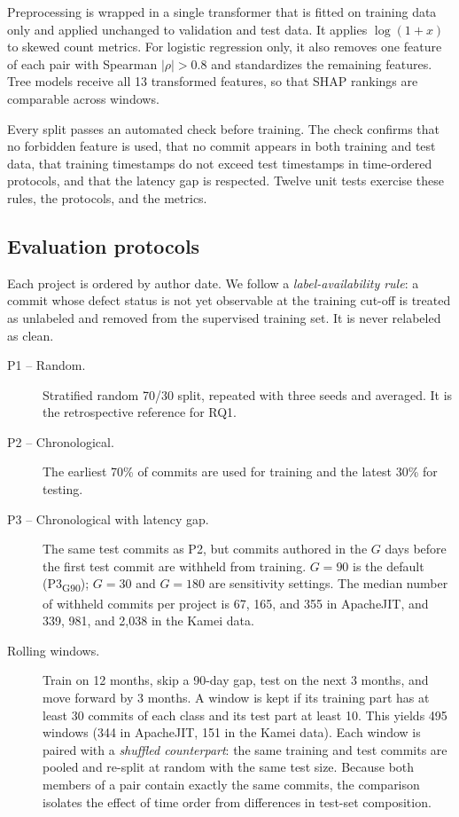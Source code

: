 \documentclass[11pt,a4paper]{article}
\newcommand{\pthree}{P3\textsubscript{G90}}
\begin{document}
Preprocessing is wrapped in a single transformer that is fitted on training data only and applied unchanged to validation and test data. It applies $\log(1+x)$ to skewed count metrics. For logistic regression only, it also removes one feature of each pair with Spearman $|\rho|>0.8$ and standardizes the remaining features. Tree models receive all 13 transformed features, so that SHAP rankings are comparable across windows.

Every split passes an automated check before training. The check confirms that no forbidden feature is used, that no commit appears in both training and test data, that training timestamps do not exceed test timestamps in time-ordered protocols, and that the latency gap is respected. Twelve unit tests exercise these rules, the protocols, and the metrics.

\subsection{Evaluation protocols}\label{sec:protocols}

Each project is ordered by author date. We follow a \emph{label-availability rule}: a commit whose defect status is not yet observable at the training cut-off is treated as unlabeled and removed from the supervised training set. It is never relabeled as clean.

\begin{description}
\item[P1 -- Random.] Stratified random 70/30 split, repeated with three seeds and averaged. It is the retrospective reference for RQ1.
\item[P2 -- Chronological.] The earliest 70\% of commits are used for training and the latest 30\% for testing.
\item[P3 -- Chronological with latency gap.] The same test commits as P2, but commits authored in the $G$ days before the first test commit are withheld from training. $G=90$ is the default (\pthree); $G=30$ and $G=180$ are sensitivity settings. The median number of withheld commits per project is 67, 165, and 355 in ApacheJIT, and 339, 981, and 2{,}038 in the Kamei data.
\item[Rolling windows.] Train on 12 months, skip a 90-day gap, test on the next 3 months, and move forward by 3 months. A window is kept if its training part has at least 30 commits of each class and its test part at least 10. This yields 495 windows (344 in ApacheJIT, 151 in the Kamei data). Each window is paired with a \emph{shuffled counterpart}: the same training and test commits are pooled and re-split at random with the same test size. Because both members of a pair contain exactly the same commits, the comparison isolates the effect of time order from differences in test-set composition.
\end{description}
\end{document}
